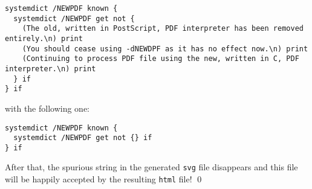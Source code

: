 \documentclass{article}
\begin{document}
\begin{verbatim}
systemdict /NEWPDF known {
  systemdict /NEWPDF get not {
    (The old, written in PostScript, PDF interpreter has been removed entirely.\n) print
    (You should cease using -dNEWDPF as it has no effect now.\n) print
    (Continuing to process PDF file using the new, written in C, PDF interpreter.\n) print
  } if
} if
\end{verbatim}
with the following one:

\begin{verbatim}
systemdict /NEWPDF known {
  systemdict /NEWPDF get not {} if
} if
\end{verbatim}

After that, the spurious string in the generated \texttt{svg} file disappears
and this file will be happily accepted by the resulting \texttt{html} file!
\qed

\newcommand{\BibAnnote}[1]{}%


\end{document}
